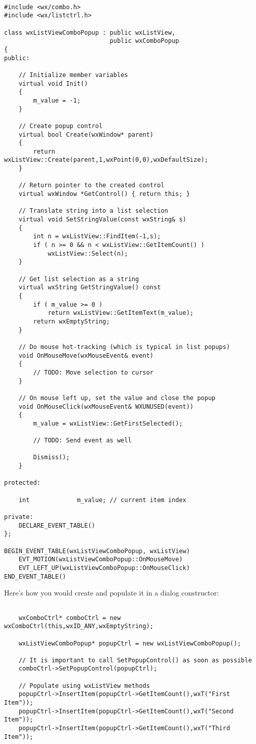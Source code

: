 \begin{verbatim}

#include <wx/combo.h>
#include <wx/listctrl.h>

class wxListViewComboPopup : public wxListView,
                             public wxComboPopup
{
public:

    // Initialize member variables
    virtual void Init()
    {
        m_value = -1;
    }

    // Create popup control
    virtual bool Create(wxWindow* parent)
    {
        return wxListView::Create(parent,1,wxPoint(0,0),wxDefaultSize);
    }

    // Return pointer to the created control
    virtual wxWindow *GetControl() { return this; }

    // Translate string into a list selection
    virtual void SetStringValue(const wxString& s)
    {
        int n = wxListView::FindItem(-1,s);
        if ( n >= 0 && n < wxListView::GetItemCount() )
            wxListView::Select(n);
    }

    // Get list selection as a string
    virtual wxString GetStringValue() const
    {
        if ( m_value >= 0 )
            return wxListView::GetItemText(m_value);
        return wxEmptyString;
    }

    // Do mouse hot-tracking (which is typical in list popups)
    void OnMouseMove(wxMouseEvent& event)
    {
        // TODO: Move selection to cursor
    }

    // On mouse left up, set the value and close the popup
    void OnMouseClick(wxMouseEvent& WXUNUSED(event))
    {
        m_value = wxListView::GetFirstSelected();

        // TODO: Send event as well

        Dismiss();
    }

protected:

    int             m_value; // current item index

private:
    DECLARE_EVENT_TABLE()
};

BEGIN_EVENT_TABLE(wxListViewComboPopup, wxListView)
    EVT_MOTION(wxListViewComboPopup::OnMouseMove)
    EVT_LEFT_UP(wxListViewComboPopup::OnMouseClick)
END_EVENT_TABLE()

\end{verbatim}

Here's how you would create and populate it in a dialog constructor:

\begin{verbatim}

    wxComboCtrl* comboCtrl = new wxComboCtrl(this,wxID_ANY,wxEmptyString);

    wxListViewComboPopup* popupCtrl = new wxListViewComboPopup();

    // It is important to call SetPopupControl() as soon as possible
    comboCtrl->SetPopupControl(popupCtrl);

    // Populate using wxListView methods
    popupCtrl->InsertItem(popupCtrl->GetItemCount(),wxT("First Item"));
    popupCtrl->InsertItem(popupCtrl->GetItemCount(),wxT("Second Item"));
    popupCtrl->InsertItem(popupCtrl->GetItemCount(),wxT("Third Item"));

\end{verbatim}

